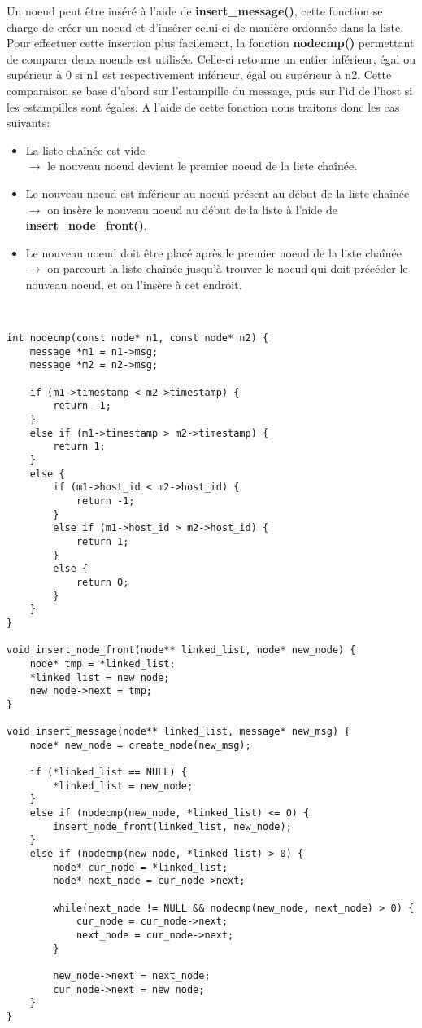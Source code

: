 Un noeud peut être inséré à l'aide de \textbf{insert\_message()}, cette fonction se charge de créer un noeud et d'insérer celui-ci de manière ordonnée dans la liste. Pour effectuer cette insertion plus facilement, la fonction \textbf{nodecmp()} permettant de comparer deux noeuds est utilisée. Celle-ci retourne un entier inférieur, égal ou supérieur à 0 si n1 est respectivement inférieur, égal ou supérieur à n2. Cette comparaison se base d'abord sur l'estampille du message, puis sur l'id de l'host si les estampilles sont égales. A l'aide de cette fonction nous traitons donc les cas suivants:\\

\begin{itemize}
	\item La liste chaînée est vide\\ $\rightarrow$ le nouveau noeud devient le premier noeud de la liste chaînée.
	\item Le nouveau noeud est inférieur au noeud présent au début de la liste chaînée\\ $\rightarrow$ on insère le nouveau noeud au début de la liste à l'aide de \textbf{insert\_node\_front()}.
	\item Le nouveau noeud doit être placé après le premier noeud de la liste chaînée\\ $\rightarrow$ on parcourt la liste chaînée jusqu'à trouver le noeud qui doit précéder le nouveau noeud, et on l'insère à cet endroit.
\end{itemize}
\

\begin{lstlisting}[caption=Insertion d'un noeud/message]
int nodecmp(const node* n1, const node* n2) {
    message *m1 = n1->msg;
    message *m2 = n2->msg;

    if (m1->timestamp < m2->timestamp) {
        return -1;
    }
    else if (m1->timestamp > m2->timestamp) {
        return 1;
    }
    else {
        if (m1->host_id < m2->host_id) {
            return -1;
        }
        else if (m1->host_id > m2->host_id) {
            return 1;
        }
        else {
            return 0;
        }
    }
}

void insert_node_front(node** linked_list, node* new_node) {
    node* tmp = *linked_list;
    *linked_list = new_node;
    new_node->next = tmp;
}

void insert_message(node** linked_list, message* new_msg) {
    node* new_node = create_node(new_msg);

    if (*linked_list == NULL) {
        *linked_list = new_node;
    }
    else if (nodecmp(new_node, *linked_list) <= 0) {
        insert_node_front(linked_list, new_node);
    }
    else if (nodecmp(new_node, *linked_list) > 0) {
        node* cur_node = *linked_list;
        node* next_node = cur_node->next;

        while(next_node != NULL && nodecmp(new_node, next_node) > 0) {
            cur_node = cur_node->next;
            next_node = cur_node->next;
        }

        new_node->next = next_node;
        cur_node->next = new_node;
    }
}
\end{lstlisting}
\

